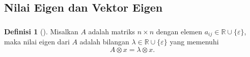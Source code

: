 \documentclass[aspectratio=169]{beamer}
\theoremstyle{definition}
\newtheorem{definisi}{Definisi}
\numberwithin{definisi}{subsection}
\newcommand{\R}{\mathbb{R}}
\begin{document}
\subsection{Nilai Eigen dan Vektor Eigen}
\begin{frame}
    \frametitle{\insertsubsection}
    \begin{definisi}[\cite{baccelli}]
        Misalkan $A$ adalah matriks $n \times n$ dengan elemen $a_{ij} \in \R \cup \{\varepsilon\}$, maka nilai eigen dari $A$ adalah bilangan $\lambda \in \R \cup \{\varepsilon\}$ yang memenuhi
        \[
            A\otimes x = \lambda \otimes x.
        \]
    \end{definisi}
\end{frame}
\end{document}

